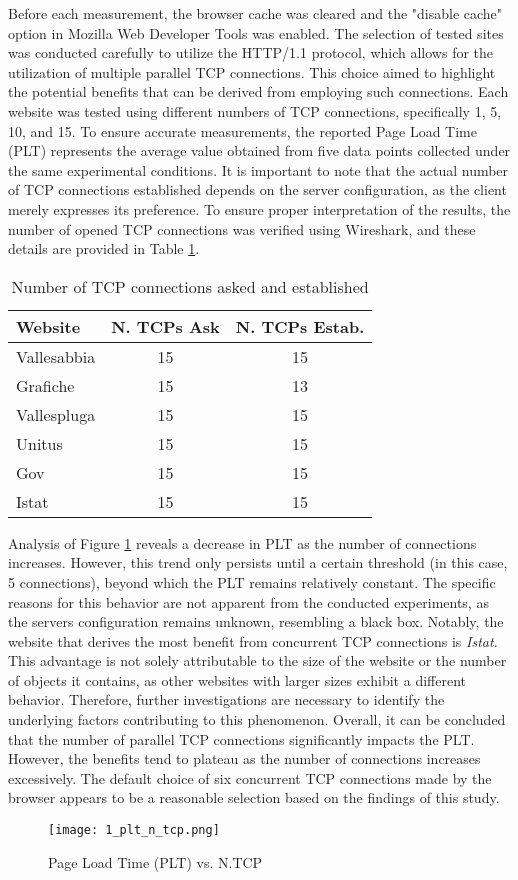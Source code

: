 Before each measurement, the browser cache was cleared and the "disable cache" option in Mozilla Web Developer Tools was enabled. 
The selection of tested sites was conducted carefully to utilize the HTTP/1.1 protocol, which allows for the utilization of multiple parallel TCP connections. 
This choice aimed to highlight the potential benefits that can be derived from employing such connections. Each website was tested using different numbers of 
TCP connections, specifically 1, 5, 10, and 15. To ensure accurate measurements, the reported Page Load Time (PLT) represents the average value obtained 
from five data points collected under the same experimental conditions.
It is important to note that the actual number of TCP connections established depends on the server configuration, as the client merely expresses its preference. 
To ensure proper interpretation of the results, the number of opened TCP connections was verified using Wireshark, and these details are provided 
in Table \ref{tab:TCP_asked}.

    \begin{table}[H]
    \centering
        \begin{tabular}{|l|c|c|}
        \hline
        \rowcolor{pyblue!60}
        \textbf{Website} & \textbf{N. TCPs Ask} & \textbf{N. TCPs Estab.} \\
        \hline
        Vallesabbia & 15 & 15 \\
        Grafiche & 15 & 13 \\
        Vallespluga & 15 & 15 \\
        Unitus & 15 & 15 \\
        Gov & 15 & 15 \\
        Istat & 15 & 15 \\
        \hline
        \end{tabular}
        \caption{\small Number of TCP connections asked and established}
        \label{tab:TCP_asked}
    \end{table}

Analysis of Figure \ref{fig:plt_n_tcp} reveals a decrease in PLT as the number of connections increases. However, this trend only persists until a certain threshold 
(in this case, 5 connections), beyond which the PLT remains relatively constant. The specific reasons for this behavior are not apparent from the conducted 
experiments, as the servers configuration remains unknown, resembling a black box. Notably, the website that derives the most benefit from concurrent TCP 
connections is \textit{Istat}. This advantage is not solely attributable to the size of the website or the number of objects it contains, as other 
websites with larger sizes exhibit a different behavior. Therefore, further investigations are necessary to identify the underlying factors contributing 
to this phenomenon.
Overall, it can be concluded that the number of parallel TCP connections significantly impacts the PLT. However, the benefits tend to plateau as the number of 
connections increases excessively. The default choice of six concurrent TCP connections made by the browser appears to be a reasonable selection based on the 
findings of this study.
    
    \begin{figure}[H]
        \centering
        \texttt{[image: 1\_plt\_n\_tcp.png]}
        \caption{\small Page Load Time (PLT) vs. N.TCP}
        \label{fig:plt_n_tcp}
    \end{figure}



